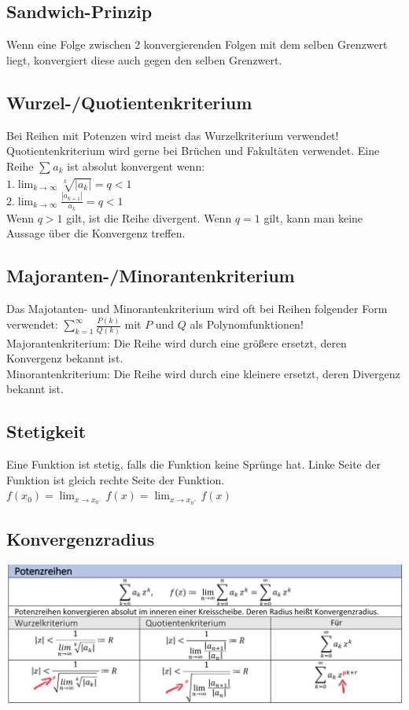 \documentclass[12pt,a4paper]{article}
\begin{document}
	\subsection{Sandwich-Prinzip}
		Wenn eine Folge zwischen 2 konvergierenden Folgen mit dem selben Grenzwert liegt, konvergiert diese auch gegen den selben Grenzwert.

	\subsection{Wurzel-/Quotientenkriterium}
		Bei Reihen mit Potenzen wird meist das Wurzelkriterium verwendet!\newline
		Quotientenkriterium wird gerne bei Brüchen und Fakultäten verwendet.\newline
		Eine Reihe $ \sum_{}^{} a_k  $ ist absolut konvergent wenn:\\
		$1. \lim_{k \to \infty} \sqrt[k]{|a_k|}  = q < 1$\\
		$2. \lim_{k \to \infty} \frac{|a_{k+1}|}{a_k}  = q < 1$\\
		Wenn $q > 1$ gilt, ist die Reihe divergent.\newline
		Wenn $q = 1$ gilt, kann man keine Aussage über die Konvergenz treffen.


	\subsection{Majoranten-/Minorantenkriterium}
		Das Majotanten- und Minorantenkriterium wird oft bei Reihen folgender Form verwendet:\newline
		$\sum^{\infty}_{k = 1} \frac{P(k)}{Q(k)}$ mit $P$ und $Q$ als Polynomfunktionen!\newline 
		Majorantenkriterium: Die Reihe wird durch eine größere ersetzt, deren Konvergenz bekannt ist.\\
		Minorantenkriterium: Die Reihe wird durch eine kleinere ersetzt, deren Divergenz bekannt ist.

	\subsection{Stetigkeit}
		Eine Funktion ist stetig, falls die Funktion keine Sprünge hat. 
		Linke Seite der Funktion ist gleich rechte Seite der Funktion.\\
		$f(x_0) = \lim_{x \to x_{0^-}} f(x) = \lim_{x \to x_{0^+}} f(x) $ \\
	
	\subsection{Konvergenzradius}
		\includegraphics[scale=0.3]{Bilder/Konvergenzradius.jpg}
\end{document}
